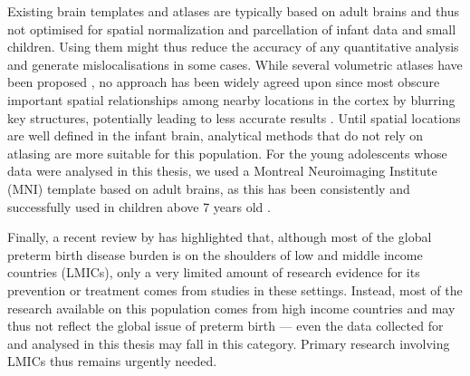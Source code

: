 Existing brain templates and atlases are typically based on adult brains and thus not optimised for spatial normalization and parcellation of infant data and small children.
Using them might thus reduce the accuracy of any quantitative analysis and generate mislocalisations in some cases. 
While several volumetric atlases have been proposed \citep{Habas2010, Kazemi2007, Shi2014}, no approach has been widely agreed upon since most obscure important spatial relationships among nearby locations in the cortex by blurring key structures, potentially leading to less accurate results \citep{Li2016}. 
Until spatial locations are well defined in the infant brain, analytical methods that do not rely on atlasing are more suitable for this population. For the young adolescents whose data were analysed in this thesis, we used a Montreal Neuroimaging Institute (MNI) template based on adult brains, as this has been consistently and successfully used in children above 7 years old  \citep{ASHBURNER1998, Burgund2002}. 

Finally, a recent review by \citet{Smid2016} has highlighted that, although most of the global preterm birth disease burden is on the shoulders of low and middle income countries (LMICs), only a very limited amount of research evidence for its prevention or treatment comes from studies in these settings. Instead, most of the research available on this population comes from high income countries and may thus not reflect the global issue of preterm birth --– even the data collected for and analysed in this thesis may fall in this category. Primary research involving LMICs thus remains urgently needed. 
